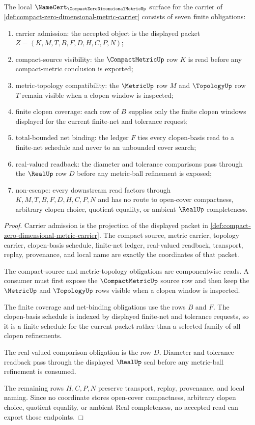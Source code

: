 \begin{theorem}
\label{thm:compact-zero-dimensional-metric-namecert-obligations}
The local $\NameCert_{\CompactZeroDimensionalMetricUp}$ surface for the carrier of \autoref{def:compact-zero-dimensional-metric-carrier} consists of seven finite obligations:
\begin{enumerate}
\item carrier admission: the accepted object is the displayed packet $Z=(K,M,T,B,F,D,H,C,P,N)$;
\item compact-source visibility: the $\CompactMetricUp$ row $K$ is read before any compact-metric conclusion is exported;
\item metric-topology compatibility: the $\MetricUp$ row $M$ and $\TopologyUp$ row $T$ remain visible when a clopen window is inspected;
\item finite clopen coverage: each row of $B$ supplies only the finite clopen windows displayed for the current finite-net and tolerance request;
\item total-bounded net binding: the ledger $F$ ties every clopen-basis read to a finite-net schedule and never to an unbounded cover search;
\item real-valued readback: the diameter and tolerance comparisons pass through the $\RealUp$ row $D$ before any metric-ball refinement is exposed;
\item non-escape: every downstream read factors through $K,M,T,B,F,D,H,C,P,N$ and has no route to open-cover compactness, arbitrary clopen choice, quotient equality, or ambient $\RealUp$ completeness.
\end{enumerate}
\end{theorem}
\begin{proof}
Carrier admission is the projection of the displayed packet in \autoref{def:compact-zero-dimensional-metric-carrier}. The compact source, metric carrier, topology carrier, clopen-basis schedule, finite-net ledger, real-valued readback, transport, replay, provenance, and local name are exactly the coordinates of that packet.

The compact-source and metric-topology obligations are componentwise reads. A consumer must first expose the $\CompactMetricUp$ source row and then keep the $\MetricUp$ and $\TopologyUp$ rows visible when a clopen window is inspected.

The finite coverage and net-binding obligations use the rows $B$ and $F$. The clopen-basis schedule is indexed by displayed finite-net and tolerance requests, so it is a finite schedule for the current packet rather than a selected family of all clopen refinements.

The real-valued comparison obligation is the row $D$. Diameter and tolerance readback pass through the displayed $\RealUp$ seal before any metric-ball refinement is consumed.

The remaining rows $H,C,P,N$ preserve transport, replay, provenance, and local naming. Since no coordinate stores open-cover compactness, arbitrary clopen choice, quotient equality, or ambient Real completeness, no accepted read can export those endpoints.
\end{proof}

